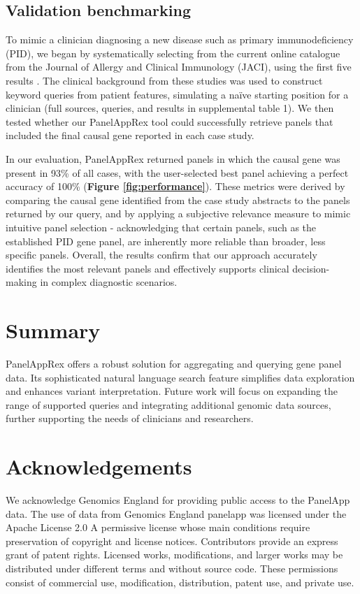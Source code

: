 \subsection{Validation benchmarking}
\noindent
To mimic a clinician diagnosing a new disease such as primary immunodeficiency (PID), we began by systematically selecting from the current online catalogue from the Journal of Allergy and Clinical Immunology (JACI), using the first five results  \cite{arruda_genetic_2015, 
mcaleer_severe_2015,
verhoeven_hematopoietic_2022,
magerus-chatinet_autoimmune_2013,
sharfe_fatal_2014}. The clinical background from these studies was used to construct keyword queries from patient features, simulating a naïve starting position for a clinician (full sources, queries, and results in supplemental table 1). We then tested whether our PanelAppRex tool could successfully retrieve panels that included the final causal gene reported in each case study. 

In our evaluation, PanelAppRex returned panels in which the causal gene was present in 93\% of all cases, with the user-selected best panel achieving a perfect accuracy of 100\% 
(\textbf{Figure \ref{fig:performance}}).
 These metrics were derived by comparing the causal gene identified from the case study abstracts to the panels returned by our query, and by applying a subjective relevance measure to mimic intuitive panel selection - acknowledging that certain panels, such as the established PID gene panel, are inherently more reliable than broader, less specific panels. Overall, the results confirm that our approach accurately identifies the most relevant panels and effectively supports clinical decision-making in complex diagnostic scenarios.


\FloatBarrier
\section{Summary}
\noindent
PanelAppRex offers a robust solution for aggregating and querying gene panel data. Its sophisticated natural language search feature simplifies data exploration and enhances variant interpretation. Future work will focus on expanding the range of supported queries and integrating additional genomic data sources, further supporting the needs of clinicians and researchers.

\section*{Acknowledgements}
\noindent
We acknowledge Genomics England for providing public access to the PanelApp data.
The use of data from Genomics England panelapp was licensed under the Apache License 2.0 A permissive license whose main conditions require preservation of copyright and license notices. Contributors provide an express grant of patent rights. Licensed works, modifications, and larger works may be distributed under different terms and without source code. These permissions consist of commercial use, modification, distribution, patent use, and  private use.



\clearpage

